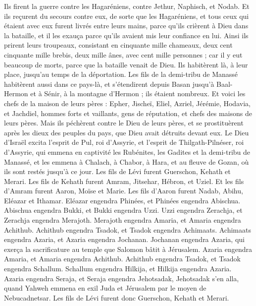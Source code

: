 \begin{multicols}{2}
Ils firent la guerre contre les Hagaréniens, contre Jethur, Naphisch, et Nodab.
Et ils reçurent du secours contre eux, de sorte que les Hagaréniens, et tous ceux qui étaient avec eux furent livrés entre leurs mains, parce qu'ils crièrent à Dieu dans la bataille, et il les exauça parce qu'ils avaient mis leur confiance en lui.
Ainsi ils prirent leurs troupeaux, consistant en cinquante mille chameaux, deux cent cinquante mille brebis, deux mille ânes, avec cent mille personnes ;
car il y eut beaucoup de morts, parce que la bataille venait de Dieu.  Ils habitèrent là, à leur place, jusqu'au temps de la déportation.
Les fils de la demi-tribu de Manassé habitèrent aussi dans ce pays-là, et s'étendirent depuis Basan jusqu'à Baal-Hermon et à Sénir, à la montagne d’Hermon ; ils étaient nombreux.
Et voici les chefs de la maison de leurs pères : Epher, Jischeï, Eliel, Azriel, Jérémie, Hodavia, et Jachdiel, hommes forts et vaillants, gens de réputation, et chefs des maisons de leurs pères.
Mais ils péchèrent contre le Dieu de leurs pères, et se prostituèrent après les dieux des peuples du pays, que Dieu avait détruits devant eux.
Le Dieu d'Israël excita l'esprit de Pul, roi d’Assyrie, et l'esprit de Thilgath-Pilnéser, roi d’Assyrie,  qui emmena en captivité les Rubénites, les Gadites et la demi-tribu de Manassé, et les emmena à Chalach, à Chabor, à Hara, et au fleuve de Gozan, où ils sont restés jusqu'à ce jour.
\VerseOne{}Les fils de Lévi furent Guerschon, Kehath et Merari.
Les fils de Kehath furent  Amram, Jitsehar, Hébron, et Uziel.
Et les fils d'Amram furent Aaron, Moïse et Marie. Les fils d'Aaron furent  Nadab, Abihu, Eléazar et Ithamar.
Eléazar engendra Phinées, et Phinées engendra Abischua.
Abischua engendra Bukki, et Bukki engendra Uzzi.
Uzzi engendra Zerachja, et Zerachja engendra Merajoth.
Merajoth engendra Amaria, et Amaria engendra Achithub.
Achithub engendra Tsadok, et Tsadok engendra Achimaats.
Achimaats engendra Azaria, et Azaria engendra Jochanan.
Jochanan engendra Azaria, qui exerça la sacrificature au temple que Salomon bâtit à Jérusalem.
Azaria engendra Amaria, et Amaria engendra Achithub.
Achithub engendra Tsadok, et Tsadok engendra Schallum.
Schallum engendra Hilkija, et Hilkija engendra Azaria.
Azaria engendra Seraja, et Seraja engendra Jehotsadak,
Jehotsadak s'en alla, quand Yahweh emmena en exil Juda et Jérusalem par le moyen de Nebucadnetsar.
Les fils de Lévi  furent donc  Guerschon, Kehath et Merari.

\end{multicols}
